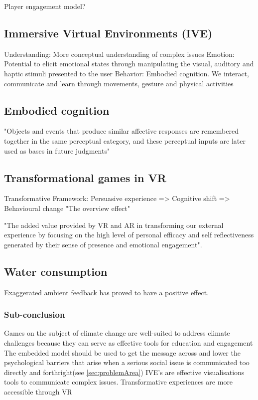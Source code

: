     Player engagement model?\cite{playerEngagement}
    
    \subsection{Immersive Virtual Environments (IVE)}
    Understanding: More conceptual understanding of complex issues\cite{vrEngagementClimateChange}
    Emotion: Potential to elicit emotional states through manipulating the visual, auditory and haptic stimuli presented to the user
    Behavior: Embodied cognition. We interact, communicate and learn through movements, gesture and physical activities\
    
    \subsection{Embodied cognition}
    "Objects and events that produce similar affective responses are remembered together in the same perceptual category, and these perceptual inputs are later used as bases in future judgments"\cite{ahn2011embodied}
    
    \subsection{Transformational games in VR}
    Transformative Framework:
    Persuasive experience => Cognitive shift => Behavioural change\cite{transformativeVR}
    "The overview effect"\cite{transformativeVR}
    
    "The added value provided by VR and AR in transforming our external experience by focusing on the high level of personal efficacy and self reflectiveness generated by their sense of presence and emotional engagement"\cite{riva2016transforming}.
    
    \subsection{Water consumption}
    Exaggerated ambient feedback has proved to have a positive effect.\cite{waterConsumption}
    
    \subsubsection{Sub-conclusion}
    Games on the subject of climate change are well-suited to address climate challenges because they can serve as effective tools for education and engagement\cite{gamesAsToolsForEngagement}
    The embedded model should be used to get the message across and lower the psychological barriers that arise when a serious social issue is communicated too directly and forthright(see \autoref{sec:problemArea})
    IVE's are effective visualisations tools to communicate complex issues.
    Transformative experiences are more accessible through VR

